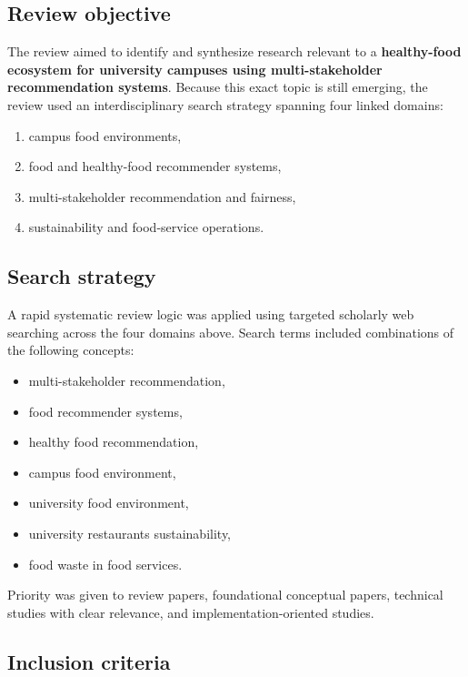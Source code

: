 \documentclass[
  letterpaper,
  DIV=11,
  numbers=noendperiod]{scrartcl}
\providecommand{\tightlist}{%
  \setlength{\itemsep}{0pt}\setlength{\parskip}{0pt}}
\begin{document}
\subsection{Review objective}\label{review-objective}

The review aimed to identify and synthesize research relevant to a
\textbf{healthy-food ecosystem for university campuses using
multi-stakeholder recommendation systems}. Because this exact topic is
still emerging, the review used an interdisciplinary search strategy
spanning four linked domains:

\begin{enumerate}
\def\labelenumi{\arabic{enumi}.}
\tightlist
\item
  campus food environments,
\item
  food and healthy-food recommender systems,
\item
  multi-stakeholder recommendation and fairness,
\item
  sustainability and food-service operations.
\end{enumerate}

\subsection{Search strategy}\label{search-strategy}

A rapid systematic review logic was applied using targeted scholarly web
searching across the four domains above. Search terms included
combinations of the following concepts:

\begin{itemize}
\tightlist
\item
  multi-stakeholder recommendation,
\item
  food recommender systems,
\item
  healthy food recommendation,
\item
  campus food environment,
\item
  university food environment,
\item
  university restaurants sustainability,
\item
  food waste in food services.
\end{itemize}

Priority was given to review papers, foundational conceptual papers,
technical studies with clear relevance, and implementation-oriented
studies.

\subsection{Inclusion criteria}\label{inclusion-criteria}
\end{document}
